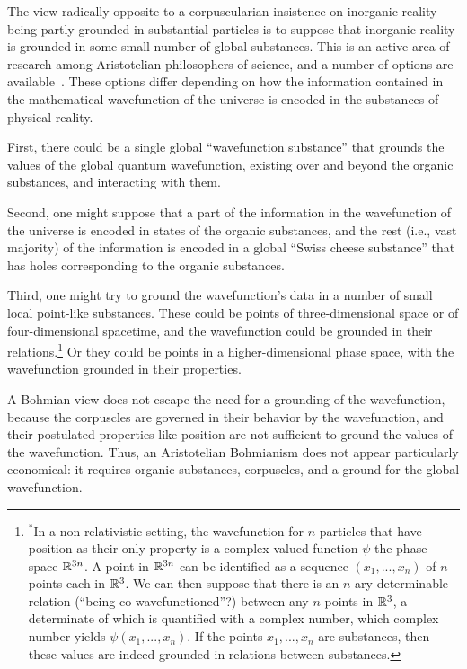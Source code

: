 The view radically opposite to a corpuscularian insistence on inorganic reality being partly grounded in substantial 
particles is to suppose that inorganic reality is grounded in some small number of global substances. This is an 
active area of research among Aristotelian philosophers of science, and a number of options are available~\parencite{KoonsPrime,PrussTraveling,SimpsonCosmic,SimpsonQPCM,SimpsonKoons}.
These options differ depending on how the information contained in the mathematical wavefunction of the universe
is encoded in the substances of physical reality.

First, there 
could be a single global ``wavefunction substance'' that grounds the values of the global quantum wavefunction, existing
over and beyond the organic substances, and interacting with them.

Second, one might suppose that a part of the information in the 
wavefunction of the universe is encoded in states of the organic substances, and the rest (i.e., vast majority) of 
the information is encoded in a global ``Swiss cheese substance'' that has holes corresponding to the organic substances. 

Third, one might try to ground the wavefunction's data in a number of small local point-like substances.
These could be points of three-dimensional space or of four-dimensional spacetime, and the wavefunction could be 
grounded in their relations.\footnote{$^*$In a non-relativistic setting, the wavefunction for $n$ particles that 
have position as their only property is a complex-valued function $\psi$ the phase space $\mathbb R^{3n}$. A point in $\mathbb R^{3n}$ can 
be identified as a sequence $(x_1,...,x_n)$ of $n$ points each in $\mathbb R^3$. We can then suppose that there is an 
$n$-ary determinable relation (``being co-wavefunctioned''?) between any $n$ points in $\mathbb R^3$, a determinate of which is 
quantified with a complex number, which complex number yields $\psi(x_1,...,x_n)$. If the points $x_1,...,x_n$ are 
substances, then these values are indeed grounded in relations between substances.} Or they could be points in a higher-dimensional
phase space, with the wavefunction grounded in their properties. 

A Bohmian view does not escape the need for a grounding of the wavefunction, because the corpuscles are 
governed in their behavior by the wavefunction, and their postulated properties like position are not sufficient to ground the values of the wavefunction. Thus, an Aristotelian Bohmianism does not appear particularly economical: it requires organic
substances, corpuscles, and a ground for the global wavefunction.

